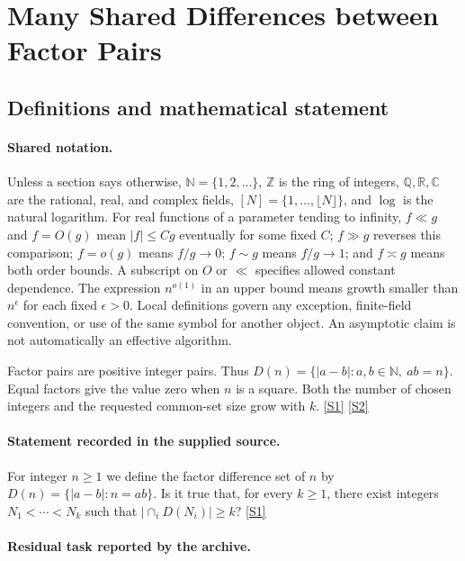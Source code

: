 \documentclass[11pt,a4paper]{article}
\newcommand{\N}{\mathbb{N}}
\newcommand{\Z}{\mathbb{Z}}
\newcommand{\Q}{\mathbb{Q}}
\newcommand{\R}{\mathbb{R}}
\newcommand{\C}{\mathbb{C}}
\newcommand{\sref}[2]{\hyperlink{source:#1:#2}{[S#2]}}
\begin{document}
\section{Many Shared Differences between Factor Pairs}\label{statement}


\subsection{Definitions and mathematical statement}

\paragraph{Shared notation.}Unless a section says otherwise, $\N=\{1,2,\ldots\}$,
$\Z$ is the ring of integers, $\Q,\R,\C$ are the rational, real, and complex
fields, $[N]=\{1,\ldots,\lfloor N\rfloor\}$, and $\log$ is the natural
logarithm. For real functions of a parameter tending to infinity,
$f\ll g$ and $f=O(g)$ mean $|f|\leq Cg$ eventually for some fixed $C$;
$f\gg g$ reverses this comparison; $f=o(g)$ means $f/g\to0$;
$f\sim g$ means $f/g\to1$; and $f\asymp g$ means both order bounds.
A subscript on $O$ or $\ll$ specifies allowed constant dependence.
The expression $n^{o(1)}$ in an upper bound means growth smaller than
$n^\epsilon$ for each fixed $\epsilon>0$. Local definitions govern any
exception, finite-field convention, or use of the same symbol for another
object. An asymptotic claim is not automatically an effective algorithm.



Factor pairs are positive integer pairs. Thus $D(n)=\{|a-b|:a,b\in\N,\ ab=n\}$. Equal factors give the value zero when $n$ is a square. Both the number of chosen integers and the requested common-set size grow with $k$. \sref{statement}{1} \sref{statement}{2}

\paragraph{Statement recorded in the supplied source.}
For integer $n\geq 1$ we define the factor difference set of $n$ by $ D(n) = \{\lvert a-b\rvert : n=ab\}. $ Is it true that, for every $k\geq 1$, there exist integers $N_1<\cdots<N_k$ such that $ \lvert \cap_i D(N_i)\rvert \geq k? $ \sref{statement}{1}

\paragraph{Residual task reported by the archive.}
\end{document}
